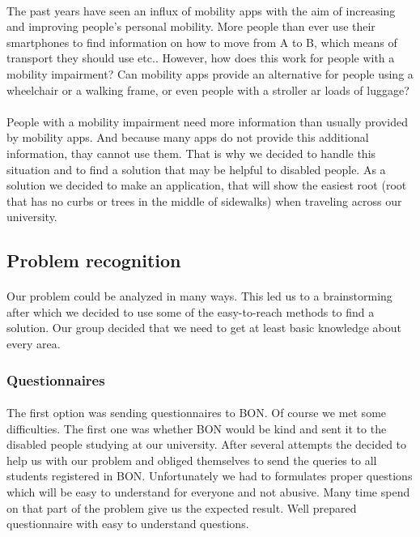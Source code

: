 \documentclass[12pt]{article}
\begin{document}
\paragraph{}The past years have seen an influx of mobility apps with the aim of increasing and improving people's personal mobility. More people than ever use their smartphones to find information on how to move from A to B, which means of transport they should use etc.. However, how does this work for people with a mobility impairment? Can mobility apps provide an alternative for people using a wheelchair or a walking frame, or even people with a stroller ar loads of luggage?\\\\
People with a mobility impairment need more information than usually provided by mobility apps. And because many apps do not provide this additional information, thay cannot use them. That is why we decided to handle this situation and to find a solution that may be helpful to disabled people.
As a solution we decided to make an application, that will show the easiest root (root that has no curbs or trees in the middle of sidewalks) when traveling across our university. 



\subsection{Problem recognition}
\paragraph{}Our problem could be analyzed in many ways. This led us to a brainstorming after which we decided to use some of the easy-to-reach methods to find a solution. Our group decided that we need to get at least basic knowledge about every area. 
\subsubsection{Questionnaires}
\paragraph{}The first option was sending questionnaires to BON. Of course we met some difficulties. The first one was whether BON would be kind and sent it to the disabled people studying at our university. After several attempts the decided to help us with our problem and obliged themselves to send the queries to all students registered in BON. Unfortunately we had to formulates proper questions which will be easy to understand for everyone and not abusive. Many time spend on that part of the problem give us the expected result. Well prepared questionnaire with easy to understand questions. 
\end{document}
